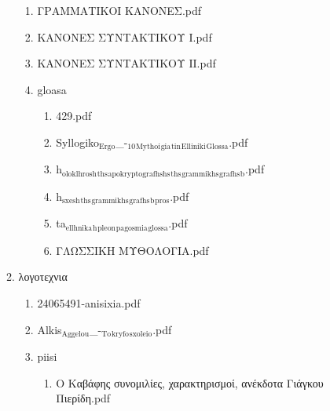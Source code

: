 \documentclass[11pt]{article}
\begin{document}
\begin{enumerate}
\begin{enumerate}
\begin{enumerate}
\item ΓΡΑΜΜΑΤΙΚΟΙ ΚΑΝΟΝΕΣ.pdf
\label{sec-1-1-1-1-49-2-2-1-84-13}

\item ΚΑΝΟΝΕΣ  ΣΥΝΤΑΚΤΙΚΟΥ  Ι.pdf
\label{sec-1-1-1-1-49-2-2-1-84-14}

\item ΚΑΝΟΝΕΣ  ΣΥΝΤΑΚΤΙΚΟΥ  ΙΙ.pdf
\label{sec-1-1-1-1-49-2-2-1-84-15}

\item gloasa
\label{sec-1-1-1-1-49-2-2-1-84-16}
\begin{enumerate}
\item 429.pdf
\label{sec-1-1-1-1-49-2-2-1-84-16-1}

\item Syllogiko$_{\text{Ergo}}$\_-$_{\text{10}}$$_{\text{Mythoi}}$$_{\text{gia}}$$_{\text{tin}}$$_{\text{Elliniki}}$$_{\text{Glossa}}$.pdf
\label{sec-1-1-1-1-49-2-2-1-84-16-2}

\item h$_{\text{oloklhrosh}}$$_{\text{ths}}$$_{\text{apokryptografhshs}}$$_{\text{ths}}$$_{\text{grammikhs}}$$_{\text{grafhs}}$$_{\text{b}}$.pdf
\label{sec-1-1-1-1-49-2-2-1-84-16-3}

\item h$_{\text{sxesh}}$$_{\text{ths}}$$_{\text{grammikhs}}$$_{\text{grafhs}}$$_{\text{b}}$$_{\text{pros}}$.pdf
\label{sec-1-1-1-1-49-2-2-1-84-16-4}

\item ta$_{\text{ellhnika}}$$_{\text{h}}$$_{\text{pleon}}$$_{\text{pagosmia}}$$_{\text{glossa}}$.pdf
\label{sec-1-1-1-1-49-2-2-1-84-16-5}

\item ΓΛΩΣΣΙΚΗ ΜΥΘΟΛΟΓΙΑ.pdf
\label{sec-1-1-1-1-49-2-2-1-84-16-6}
\end{enumerate}
\end{enumerate}

\item λογοτεχνια
\label{sec-1-1-1-1-49-2-2-1-85}
\begin{enumerate}
\item 24065491-anisixia.pdf
\label{sec-1-1-1-1-49-2-2-1-85-1}

\item Alkis$_{\text{Aggelou}}$\_-$_{\text{To}}$$_{\text{kryfo}}$$_{\text{sxoleio}}$.pdf
\label{sec-1-1-1-1-49-2-2-1-85-2}

\item piisi
\label{sec-1-1-1-1-49-2-2-1-85-3}
\begin{enumerate}
\item Ο Καβάφης συνομιλίες, χαρακτηρισμοί, ανέκδοτα  Γιάγκου Πιερίδη.pdf
\label{sec-1-1-1-1-49-2-2-1-85-3-1}


\end{enumerate}
\end{enumerate}
\end{enumerate}
\end{enumerate}
\end{document}
